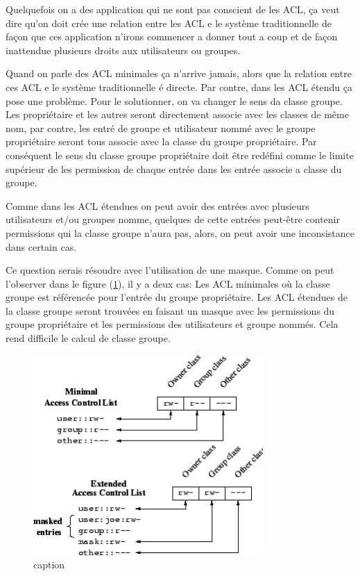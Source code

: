 Quelquefois on a des application qui ne sont pas conscient de les ACL, ça veut dire qu'on doit crée une relation entre les ACL e le système traditionnelle de façon que ces application n'irons commencer a donner tout a coup et de façon inattendue plusieurs droits aux utilisateurs ou groupes. 

Quand on parle des ACL minimales ça n'arrive jamais, alors que la relation entre ces ACL e le système traditionnelle é directe. Par contre, dans les ACL étendu ça pose une problème. Pour le solutionner, on va changer le sens da classe groupe. Les propriétaire et les autres seront directement associe avec les classes de même nom, par contre, les entré de groupe et utilisateur nommé avec le groupe propriétaire seront tous associe avec la classe du groupe propriétaire. Par conséquent le sens du classe groupe propriétaire doit être redéfini comme le limite supérieur de les permission de chaque entrée dans les entrée associe a classe du groupe.

Comme dans les ACL étendues on peut avoir des entrées avec plusieurs utilisateurs et/ou groupes nomme, quelques de cette entrées peut-être contenir permissions qui la classe groupe n'aura pas, alors, on peut avoir une inconsistance dans certain cas. 


Ce question serais résoudre avec l'utilisation de une masque. Comme on peut l'observer dans le figure (\ref{fig:img_acl-mapping}), il y a deux cas:  Les ACL minimales où la classe groupe est référencée pour l'entrée du groupe propriétaire. Les ACL étendues de la classe groupe seront trouvées en faisant un masque avec les permissions du groupe propriétaire et les permissions des utilisateurs et groupe nommés. Cela rend difficile le calcul de classe groupe. 

\begin{figure}[htbp]
\centering
\includegraphics[height=3in]{img/acl-mapping.jpg}
\caption{caption}
\label{fig:img_acl-mapping}
\end{figure}
 
